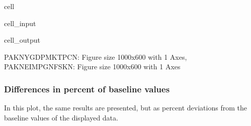 \documentclass[letterpaper,10pt,english]{jupyterBook}
\begin{document}
\begin{sphinxuseclass}{cell}\begin{sphinxVerbatimInput}

\begin{sphinxuseclass}{cell_input}
\begin{sphinxVerbatim}[commandchars=\\\{\}]
 
\end{sphinxVerbatim}

\end{sphinxuseclass}\end{sphinxVerbatimInput}
\begin{sphinxVerbatimOutput}

\begin{sphinxuseclass}{cell_output}
\begin{sphinxVerbatim}[commandchars=\\\{\}]
\PYGZob{}\PYGZsq{}PAKNYGDPMKTPCN\PYGZsq{}: \PYGZlt{}Figure size 1000x600 with 1 Axes\PYGZgt{},
 \PYGZsq{}PAKNEIMPGNFSKN\PYGZsq{}: \PYGZlt{}Figure size 1000x600 with 1 Axes\PYGZgt{}\PYGZcb{}
\end{sphinxVerbatim}

\end{sphinxuseclass}\end{sphinxVerbatimOutput}

\end{sphinxuseclass}

\subsubsection{Differences in percent of baseline values}
\label{\detokenize{content/06_WBModels/ScenarioAnalysis:differences-in-percent-of-baseline-values}}
\sphinxAtStartPar
In this plot, the same results are presented, but as percent deviations from the baseline values of the displayed data.
\end{document}
